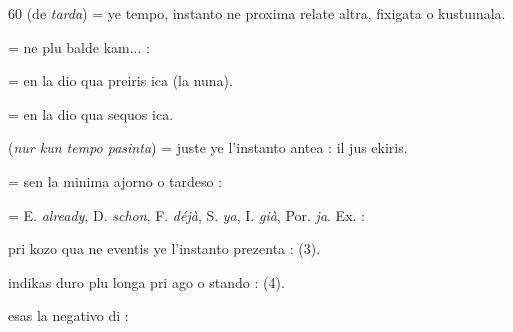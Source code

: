 \begin{VUpage}[64]{60}
 (de \textit{tarda}) = ye tempo, instanto ne proxima relate\nl
altra, fixigata o kustumala.

 = ne plu balde kam... : 

 = en la dio qua preiris ica (la nuna).

 = en la dio qua sequos ica.

 (\textit{nur kun tempo pasinta}) = juste ye l'instanto antea :\nl
il jus ekiris.

 = sen la minima ajorno o tardeso : \nl
{}

 = E. \textit{already}, D. \textit{schon}, F. \textit{déjà}, S. \textit{ya}, I. \textit{già}, Por. \textit{ja}.\nl
Ex. : 

 pri kozo qua ne eventis ye l'instanto prezenta : \nl
{} (3).

 indikas duro plu longa pri ago o stando : \nl
{} (4).

 esas la negativo di  : \nl
{}\parplein
\end{VUpage}

